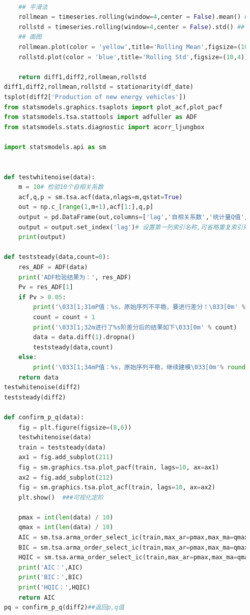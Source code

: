 \documentclass{apmcmthesis}
\begin{document}
\begin{lstlisting}[language=Python,caption={The Python Source code of Algorithm}]
        
        ## 平滑法
        rollmean = timeseries.rolling(window=4,center = False).mean() ## 滚动平均
        rollstd = timeseries.rolling(window=4,center = False).std() ## 滚动标准差
        ## 画图 
        rollmean.plot(color = 'yellow',title='Rolling Mean',figsize=(10,4))
        rollstd.plot(color = 'blue',title='Rolling Std',figsize=(10,4))
        
        return diff1,diff2,rollmean,rollstd
    diff1,diff2,rollmean,rollstd = stationarity(df_date)
    tsplot(diff2['Production of new energy vehicles'])
    from statsmodels.graphics.tsaplots import plot_acf,plot_pacf
    from statsmodels.tsa.stattools import adfuller as ADF
    from statsmodels.stats.diagnostic import acorr_ljungbox
    
    import statsmodels.api as sm
    
    
    def testwhitenoise(data):
        m = 10# 检验10个自相关系数
        acf,q,p = sm.tsa.acf(data,nlags=m,qstat=True)
        out = np.c_[range(1,m+1),acf[1:],q,p]
        output = pd.DataFrame(out,columns=['lag','自相关系数','统计量Q值','p_values'])
        output = output.set_index('lag')# 设置第一列索引名称,可省略重复索引列1
        print(output)
    
    def teststeady(data,count=0):
        res_ADF = ADF(data)
        print('ADF检验结果为：', res_ADF)
        Pv = res_ADF[1]
        if Pv > 0.05:
            print('\033[1;31mP值：%s，原始序列不平稳，要进行差分！\033[0m' % round(Pv,5))
            count = count + 1
            print('\033[1;32m进行了%s阶差分后的结果如下\033[0m' % count)
            data = data.diff(1).dropna()
            teststeady(data,count)
        else:
            print('\033[1;34mP值：%s，原始序列平稳，继续建模\033[0m'% round(Pv,5))
        return data
    testwhitenoise(diff2)
    teststeady(diff2)
    
    def confirm_p_q(data):
        fig = plt.figure(figsize=(8,6))
        testwhitenoise(data)
        train = teststeady(data)
        ax1 = fig.add_subplot(211)
        fig = sm.graphics.tsa.plot_pacf(train, lags=10, ax=ax1)
        ax2 = fig.add_subplot(212)
        fig = sm.graphics.tsa.plot_acf(train, lags=10, ax=ax2)
        plt.show()  ###可视化定阶
    
        pmax = int(len(data) / 10)
        qmax = int(len(data) / 10)
        AIC = sm.tsa.arma_order_select_ic(train,max_ar=pmax,max_ma=qmax,ic='aic')['aic_min_order']
        BIC = sm.tsa.arma_order_select_ic(train,max_ar=pmax,max_ma=qmax,ic='bic')['bic_min_order']
        HQIC = sm.tsa.arma_order_select_ic(train,max_ar=pmax,max_ma=qmax,ic='hqic')['hqic_min_order']
        print('AIC：',AIC)
        print('BIC：',BIC)
        print('HQIC：',HQIC)
        return AIC
    pq = confirm_p_q(diff2)##返回p,q值
    

\end{lstlisting}
\end{document}
